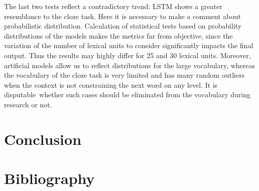 \documentclass[a4paper]{article}
\begin{document}
The last two tests reflect a contradictory trend: LSTM shows a greater resemblance to the cloze task. Here it is necessary to make a comment about probabilistic distribution. Calculation of statistical tests based on probability distributions of the models makes the metrics far from objective, since the variation of the number of lexical units to consider significantly impacts the final output. Thus the results may highly differ for 25 and 30 lexical units. Moreover, artificial models allow us to reflect distributions for the large vocabulary, whereas the vocabulary of the cloze task is very limited and has many random outliers when the context is not constraining the next word on any level. It is disputable whether such cases should be eliminated from the vocabulary during research or not.                          

\section{Conclusion}

\section{Bibliography}%


\end{document}
